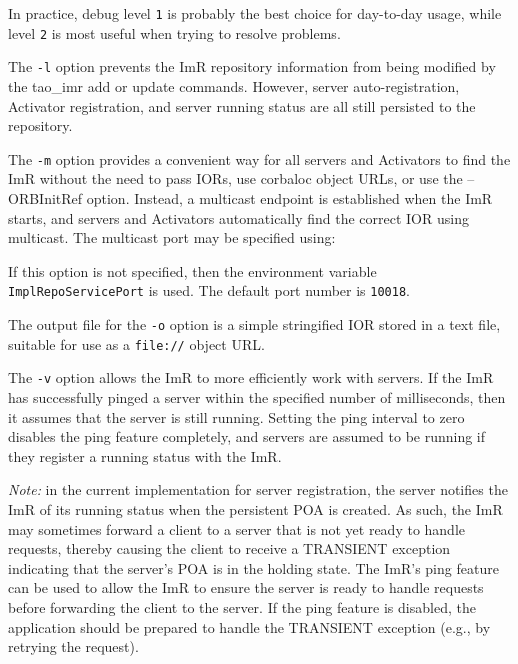 \begin{itemize}
{\begin{itemize}
{\begin{description}
In practice, debug level {\tt 1} is probably the best choice for day-to-day usage, while level {\tt 2} is most 
useful when trying to resolve problems.

The {\tt -l} option prevents the ImR repository information from being modified by the tao_imr add or 
update commands. However, server auto-registration, Activator registration, and server running status are 
all still persisted to the repository. 

The {\tt -m} option provides a convenient way for all servers and Activators to find the ImR without 
the need to pass IORs, use corbaloc object URLs, or use the –ORBInitRef option. Instead, a multicast 
endpoint is established when the ImR starts, and servers and Activators automatically find the correct 
IOR using multicast. The multicast port may be specified using:


If this option is not specified, then the environment variable {\tt ImplRepoServicePort} is used. The 
default port number is {\tt 10018}. 

The output file for the {\tt -o} option is a simple stringified IOR stored in a text file, suitable for use as a 
{\tt file://} object URL. 

The {\tt -v} option allows the ImR to more efficiently work with servers. If the ImR has successfully 
pinged a server within the specified number of milliseconds, then it assumes that the server is still 
running.  Setting the ping interval to zero disables the ping feature completely, and servers are assumed 
to be running if they register a running status with the ImR. 

\emph {Note:}  in the current implementation for server registration, the server notifies the ImR of its 
running status when the persistent POA is created. As such, the ImR may sometimes forward a client to 
a server that is not yet ready to handle requests, thereby causing the client to receive a TRANSIENT 
exception indicating that the server’s POA is in the holding state. The ImR’s ping feature can be used 
to allow the ImR to ensure the server is ready to handle requests before forwarding the client to the 
server. If the ping feature is disabled, the application should be prepared to handle the TRANSIENT 
exception (e.g., by retrying the request).
 

\end{description}}
\end{itemize}}
\end{itemize}
